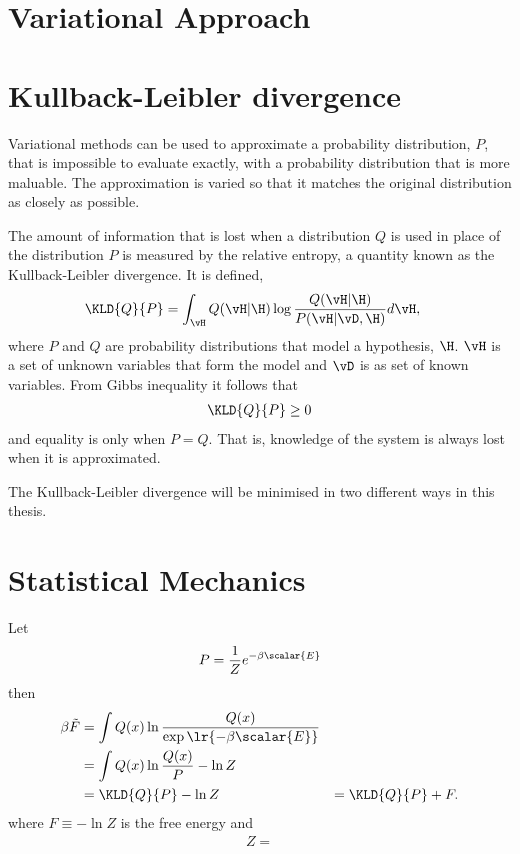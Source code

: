 {\section{Variational Approach}

\section{Kullback-Leibler divergence}

Variational methods can be used to approximate a probability distribution, $P$, that is impossible to evaluate exactly, 
with a probability distribution that is more maluable.
The approximation is varied so that it matches the original distribution as closely as possible. 


The amount of information that is lost when a distribution $Q$ is used in place of the distribution $P$ is measured by the relative entropy, 
a quantity known as the  Kullback-Leibler divergence.
It is defined,
\begin{align}
\KLD{Q}{P} &= \int_\vH Q(\vH|\H) \log\frac{Q(\vH|\H)}{P(\vH|\vD,\H)} d\vH,
\end{align}
where $P$ and $Q$ are probability distributions that model a hypothesis, $\H$.
$\vH$ is a set of unknown variables that form the model and $\vD$ is as set of known variables.
From Gibbs inequality it follows that 
\begin{align}
\KLD{Q}{P} \ge 0
\end{align}
and equality is only when $P=Q$.
That is, knowledge of the system is always lost when it is approximated.

The Kullback-Leibler divergence will be minimised in two different ways in this thesis.

\section{Statistical Mechanics}

  Let 
  \begin{align}
    P = \frac{1}{Z} e^{-\beta \scalar{E} }
  \end{align}
  then
  \begin{align}
    \beta \tilde{F} &= \int Q(x) \ln \frac{Q(x)}{\exp\lr{-\beta \scalar{E} }} \\
    &= \int Q(x) \ln \frac{Q(x)}{P} - \ln Z \\
    &= \KLD{Q}{P} - \ln Z
    &= \KLD{Q}{P} + F.
  \end{align}
  where $F \equiv  - \ln Z$ is the free energy and 
  \begin{align}
    Z = 
  \end{align}

}
